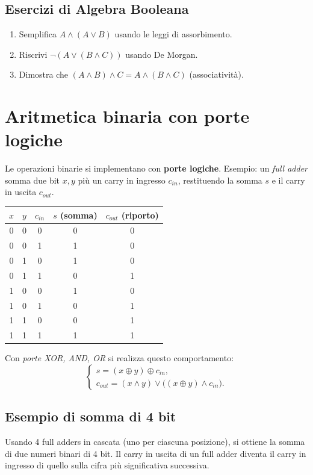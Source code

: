 \documentclass[a4paper,12pt]{report}
\begin{document}
\subsection*{Esercizi di Algebra Booleana}
\begin{enumerate}
    \item Semplifica \(A \land (A \lor B)\) usando le leggi di assorbimento.  
    \item Riscrivi \(\lnot(A \lor (B \land C))\) usando De Morgan.
    \item Dimostra che \((A \land B) \land C = A \land (B \land C)\) (associatività).
\end{enumerate}


\section{Aritmetica binaria con porte logiche}\label{sec:porte_logiche}
Le operazioni binarie si implementano con \textbf{porte logiche}. Esempio: un \emph{full adder} somma due bit \(x,y\) più un carry in ingresso \(c_{in}\), restituendo la somma \(s\) e il carry in uscita \(c_{out}\).

\begin{center}
\begin{tabular}{c|c|c|c|c}
\toprule
$x$ & $y$ & $c_{in}$ & $s$ (somma) & $c_{out}$ (riporto)\\
\midrule
0 & 0 & 0 & 0 & 0 \\
0 & 0 & 1 & 1 & 0 \\
0 & 1 & 0 & 1 & 0 \\
0 & 1 & 1 & 0 & 1 \\
1 & 0 & 0 & 1 & 0 \\
1 & 0 & 1 & 0 & 1 \\
1 & 1 & 0 & 0 & 1 \\
1 & 1 & 1 & 1 & 1 \\
\bottomrule
\end{tabular}
\end{center}
Con \emph{porte XOR, AND, OR} si realizza questo comportamento:
\[
\begin{cases}
s = (x \oplus y) \oplus c_{in},\\
c_{out} = (x \land y) \lor \bigl( (x \oplus y)\land c_{in}\bigr).
\end{cases}
\]

\subsection*{Esempio di somma di 4 bit}
Usando 4 full adders in cascata (uno per ciascuna posizione), si ottiene la somma di due numeri binari di 4 bit. Il carry in uscita di un full adder diventa il carry in ingresso di quello sulla cifra più significativa successiva.
\end{document}
